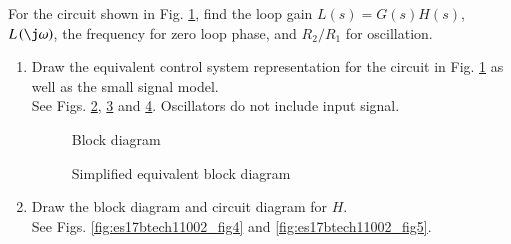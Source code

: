 For the circuit shown in Fig. \ref{fig:es17btech11002_fig1}, find the loop gain $L(s) = G(s)H(s)$, $L\brak{\j\omega}$, the frequency for zero loop phase, and $R_{2}/R_{1}$ for oscillation.
\begin{enumerate}[label=\arabic*.,ref=\theenumi]
\item Draw the equivalent control system representation for the circuit in Fig. \ref{fig:es17btech11002_fig1} as well as the small signal model. 
\\
\solution See Figs. \ref{fig:es17btech11002_block}, \ref{fig:es17btech11002_fig2} and \ref{fig:es17btech11002_fig3}. Oscillators do not include input signal.
%
\renewcommand{\thefigure}{\theenumi.\arabic{figure}}
%
\begin{figure}[!ht]
	\begin{center}
		\resizebox{\columnwidth}{!}{}
	\end{center}
\caption{}
\label{fig:es17btech11002_fig1}
\end{figure}
%
\begin{figure}[!ht]
	\begin{center}
		\resizebox{\columnwidth}{!}{}
	\end{center}
\caption{Block diagram}
\label{fig:es17btech11002_block}
\end{figure}
\begin{figure}[!ht]
	\begin{center}
		\resizebox{\columnwidth}{!}{}
	\end{center}
\caption{Simplified equivalent block diagram}
\label{fig:es17btech11002_fig2}
\end{figure}
%
\begin{figure}[!ht]
	\begin{center}
		\resizebox{\columnwidth}{!}{}
	\end{center}
\caption{}
\label{fig:es17btech11002_fig3}
\end{figure}
\renewcommand{\thefigure}{\theenumi}
%
\item Draw the block diagram and circuit diagram for $H$.\\
\solution See Figs. \ref{fig:es17btech11002_fig4} and \ref{fig:es17btech11002_fig5}. 
\renewcommand{\thefigure}{\theenumi.\arabic{figure}}
\begin{figure}[!ht]

\end{figure}
\end{enumerate}
